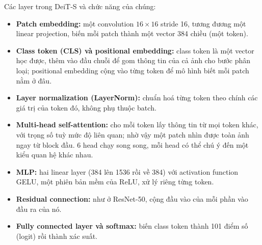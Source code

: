 \documentclass[a4paper,12pt]{article}
\begin{document}
Các layer trong DeiT-S và chức năng của chúng:
\begin{itemize}
    \item \textbf{Patch embedding:} một convolution \(16\times16\) stride 16, tương đương một linear projection, biến mỗi patch thành một vector 384 chiều (một token).
    \item \textbf{Class token (CLS) và positional embedding:} class token là một vector học được, thêm vào đầu chuỗi để gom thông tin của cả ảnh cho bước phân loại; positional embedding cộng vào từng token để mô hình biết mỗi patch nằm ở đâu.
    \item \textbf{Layer normalization (LayerNorm):} chuẩn hoá từng token theo chính các giá trị của token đó, không phụ thuộc batch.
    \item \textbf{Multi-head self-attention:} cho mỗi token lấy thông tin từ mọi token khác, với trọng số tuỳ mức độ liên quan; nhờ vậy một patch nhìn được toàn ảnh ngay từ block đầu. 6 head chạy song song, mỗi head có thể chú ý đến một kiểu quan hệ khác nhau.
    \item \textbf{MLP:} hai linear layer (384 lên 1536 rồi về 384) với activation function GELU, một phiên bản mềm của ReLU, xử lý riêng từng token.
    \item \textbf{Residual connection:} như ở ResNet-50, cộng đầu vào của mỗi phần vào đầu ra của nó.
    \item \textbf{Fully connected layer và softmax:} biến class token thành 101 điểm số (logit) rồi thành xác suất.
\end{itemize}
\end{document}
